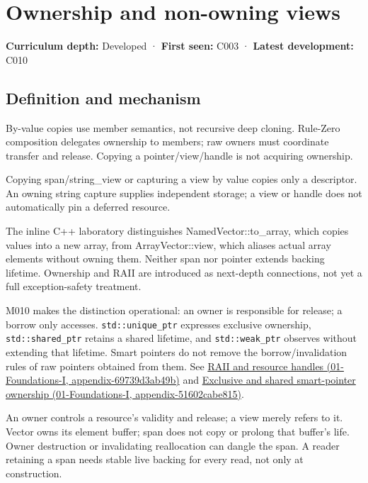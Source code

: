 \hypertarget{appendix-d52e4486f527}{}
\section{Ownership and non-owning views}\label{appendix-d52e4486f527-ownership-and-non-owning-views}

\textbf{Curriculum depth:} Developed · \textbf{First seen:} C003 · \textbf{Latest development:} C010

\subsection{Definition and mechanism}\label{appendix-d52e4486f527-definition-and-mechanism}

By-value copies use member semantics, not recursive deep cloning. Rule-Zero composition delegates ownership to members; raw owners must coordinate transfer and release. Copying a pointer/view/handle is not acquiring ownership.

Copying span/string\_view or capturing a view by value copies only a descriptor. An owning string capture supplies independent storage; a view or handle does not automatically pin a deferred resource.

The inline C++ laboratory distinguishes NamedVector::to\_array, which copies values into a new array, from ArrayVector::view, which aliases actual array elements without owning them. Neither span nor pointer extends backing lifetime. Ownership and RAII are introduced as next-depth connections, not yet a full exception-safety treatment.

M010 makes the distinction operational: an owner is responsible for release; a borrow only accesses. \texttt{std::unique\_ptr} expresses exclusive ownership, \texttt{std::shared\_ptr} retains a shared lifetime, and \texttt{std::weak\_ptr} observes without extending that lifetime. Smart pointers do not remove the borrow/invalidation rules of raw pointers obtained from them. See \href{../01-Foundations-I/main.pdf\#nameddest=appendix-69739d3ab49b}{RAII and resource handles (01-Foundations-I, appendix-69739d3ab49b)} and \href{../01-Foundations-I/main.pdf\#nameddest=appendix-51602cabe815}{Exclusive and shared smart-pointer ownership (01-Foundations-I, appendix-51602cabe815)}.

An owner controls a resource's validity and release; a view merely refers to it. Vector owns its element buffer; span does not copy or prolong that buffer's life. Owner destruction or invalidating reallocation can dangle the span. A reader retaining a span needs stable live backing for every read, not only at construction.

